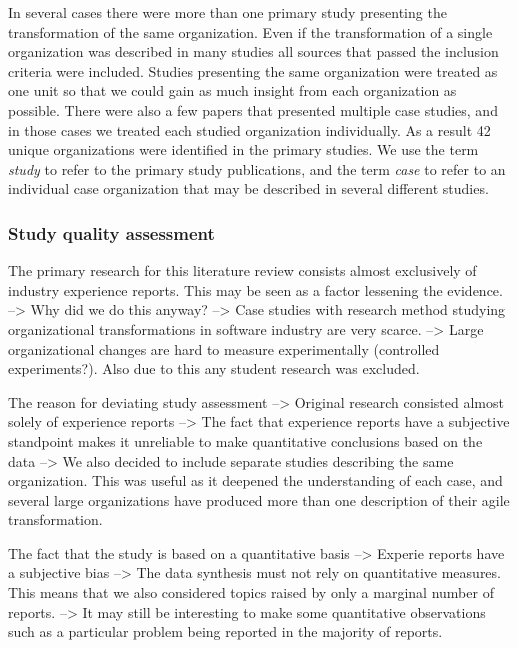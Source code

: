 \documentclass[preprint,authoryear,12pt]{elsarticle}
\begin{document}
In several cases there were more than one primary study presenting the
transformation of the same organization. Even if the transformation of a single
organization was described in many studies all sources that passed the inclusion
criteria were included. Studies presenting the same organization were treated
as one unit so that we could gain as much insight from each organization as
possible. There were also a few papers that presented multiple case studies, and
in those cases we treated each studied organization individually. As a result 42
unique organizations were identified in the primary studies. We use the term
\emph{study} to refer to the primary study publications, and the term
\emph{case} to refer to an individual case organization that may be described in
several different studies.


% 


\subsubsection{Study quality assessment}

The primary research for this literature review consists almost exclusively of
industry experience reports. This may be seen as a factor lessening the
evidence.
--> Why did we do this anyway?
--> Case studies with research method studying organizational transformations in
    software industry are very scarce.
--> Large organizational changes are hard to measure experimentally (controlled
    experiments?). Also due to this any student research was excluded.

The reason for deviating study assessment
--> Original research consisted almost solely of experience reports
--> The fact that experience reports have a subjective standpoint makes it
    unreliable to make quantitative conclusions based on the data
--> We also decided to include separate studies describing the same organization.
    This was useful as it deepened the understanding of each case, and several
    large organizations have produced more than one description of their agile
    transformation.

The fact that the study is based on a quantitative basis
--> Experie reports have a subjective bias
--> The data synthesis must not rely on quantitative measures. This means that
    we also considered topics raised by only a marginal number of reports.
--> It may still be interesting to make some quantitative observations such as
    a particular problem being reported in the majority of reports.
\end{document}
